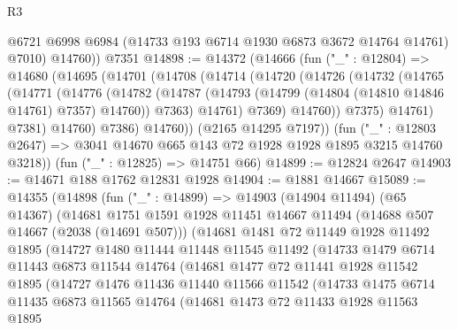 \begin{lexlean}{R3}
\begin{coremodule}
          @6721
          @6998
          @6984
          (@14733 @193 @6714 @1930 @6873 @3672 @14764 @14761)
          @7010)
        @14760))
    @7351
@14898 := @14372
    (@14666
      (fun ("_" : @12804) =>
      @14680
        (@14695
          (@14701
            (@14708
              (@14714
                (@14720
                  (@14726
                    (@14732
                      (@14765
                        (@14771
                          (@14776
                            (@14782
                              (@14787
                                (@14793 (@14799 (@14804 (@14810 @14846 @14761) @7357) @14760))
                                @7363)
                              @14761)
                            @7369)
                          @14760))
                      @7375)
                    @14761)
                  @7381)
                @14760)
              @7386)
            @14760))
        (@2165 @14295 @7197))
      (fun ("_" : @12803 @2647) => @3041 @14670 @665 @143 @72 @1928 @1928 @1895 @3215 @14760 @3218))
    (fun ("_" : @12825) => @14751 @66)
@14899 := @12824 @2647
@14903 := @14671 @188 @1762 @12831 @1928
@14904 := @1881 @14667
@15089 := @14355
    (@14898
      (fun ("_" : @14899) =>
      @14903
        (@14904 @11494)
        (@65 @14367)
        (@14681
          @1751
          @1591
          @1928
          @11451
          @14667
          @11494
          (@14688 @507 @14667 (@2038 (@14691 @507)))
          (@14681
            @1481
            @72
            @11449
            @1928
            @11492
            @1895
            (@14727
              @1480
              @11444
              @11448
              @11545
              @11492
              (@14733
                @1479
                @6714
                @11443
                @6873
                @11544
                @14764
                (@14681
                  @1477
                  @72
                  @11441
                  @1928
                  @11542
                  @1895
                  (@14727
                    @1476
                    @11436
                    @11440
                    @11566
                    @11542
                    (@14733
                      @1475
                      @6714
                      @11435
                      @6873
                      @11565
                      @14764
                      (@14681
                        @1473
                        @72
                        @11433
                        @1928
                        @11563
                        @1895

\end{coremodule}
\end{lexlean}
